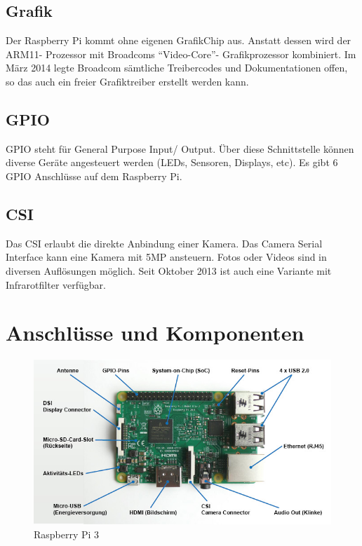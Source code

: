 \documentclass[12pt,a4paper]{article}
\begin{document}
\subsection{Grafik}

Der Raspberry Pi kommt ohne eigenen GrafikChip aus. Anstatt dessen wird der ARM11- Prozessor mit Broadcoms “Video-Core”- Grafikprozessor kombiniert. Im März 2014 legte Broadcom sämtliche Treibercodes und Dokumentationen offen, so das auch ein freier Grafiktreiber erstellt werden kann.

\subsection{GPIO}

GPIO steht für General Purpose Input/ Output. Über diese Schnittstelle können diverse Geräte angesteuert werden (LEDs, Sensoren, Displays, etc). Es gibt 6 GPIO Anschlüsse auf dem Raspberry Pi.

\subsection{CSI}

Das CSI erlaubt die direkte Anbindung einer Kamera. Das Camera Serial Interface kann eine Kamera mit 5MP ansteuern. Fotos oder Videos sind in diversen Auflösungen möglich. Seit Oktober 2013 ist auch eine Variante mit Infrarotfilter verfügbar.


\clearpage
\appendix
\makeatletter
\def\@seccntformat#1{Anhang~\csname the#1\endcsname:\quad}
\makeatother

\section{Anschlüsse und Komponenten}
\label{apx:comp}

\begin{figure}[h]
\centering
\includegraphics[scale=0.7]{raspberry_loesung}
\caption{Raspberry Pi 3}
\label{fig:rp_ls}
\end{figure}
\end{document}
